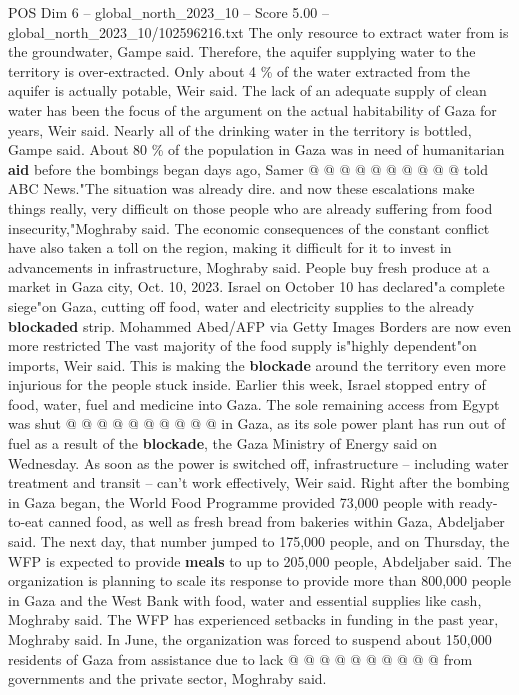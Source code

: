 \begin{textsample}{POS Dim 6 – global\_north\_2023\_10 – Score 5.00 – global\_north\_2023\_10/102596216.txt}
The only resource to extract water from is the groundwater, Gampe said.
Therefore, the aquifer supplying water to the territory is over-extracted.
Only about 4 \% of the water extracted from the aquifer is actually potable, Weir said.
The lack of an adequate supply of clean water has been the focus of the argument on the actual habitability of Gaza for years, Weir said.
Nearly all of the drinking water in the territory is bottled, Gampe said.
About 80 \% of the population in Gaza was in need of humanitarian \textbf{aid} before the bombings began days ago, Samer @ @ @ @ @ @ @ @ @ @ told ABC News."The situation was already dire. and now these escalations make things really, very difficult on those people who are already suffering from food insecurity,"Moghraby said.
The economic consequences of the constant conflict have also taken a toll on the region, making it difficult for it to invest in advancements in infrastructure, Moghraby said.
People buy fresh produce at a market in Gaza city, Oct. 10, 2023.
Israel on October 10 has declared"a complete siege"on Gaza, cutting off food, water and electricity supplies to the already \textbf{blockaded} strip.
Mohammed Abed/AFP via Getty Images Borders are now even more restricted The vast majority of the food supply is"highly dependent"on imports, Weir said.
This is making the \textbf{blockade} around the territory even more injurious for the people stuck inside.
Earlier this week, Israel stopped entry of food, water, fuel and medicine into Gaza.
The sole remaining access from Egypt was shut @ @ @ @ @ @ @ @ @ @ in Gaza, as its sole power plant has run out of fuel as a result of the \textbf{blockade}, the Gaza Ministry of Energy said on Wednesday.
As soon as the power is switched off, infrastructure -- including water treatment and transit -- can't work effectively, Weir said.
Right after the bombing in Gaza began, the World Food Programme provided 73,000 people with ready-to-eat canned food, as well as fresh bread from bakeries within Gaza, Abdeljaber said.
The next day, that number jumped to 175,000 people, and on Thursday, the WFP is expected to provide \textbf{meals} to up to 205,000 people, Abdeljaber said.
The organization is planning to scale its response to provide more than 800,000 people in Gaza and the West Bank with food, water and essential supplies like cash, Moghraby said.
The WFP has experienced setbacks in funding in the past year, Moghraby said.
In June, the organization was forced to suspend about 150,000 residents of Gaza from assistance due to lack @ @ @ @ @ @ @ @ @ @ from governments and the private sector, Moghraby said.

\end{textsample}
